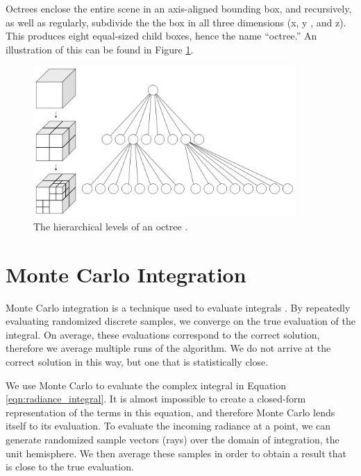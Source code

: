 Octrees enclose the entire scene in an axis-aligned bounding box, and recursively, as well as regularly, subdivide the the box in all three dimensions (x, y , and z). This produces eight equal-sized child boxes, hence the name “octree.” An illustration of this can be found in Figure \ref{fig:octree}.

\begin{figure}
   \centering
   \includegraphics[width=100mm]{../img/octree.png}
   \captionfonts
   \caption[Octree]{The hierarchical levels of an octree \cite{bib:octree}.}
   \label{fig:octree}
\end{figure}

\section{Monte Carlo Integration}
\label{sec:monte_carlo_integration}

Monte Carlo integration is a technique used to evaluate integrals \cite{bib:pbr}. By repeatedly evaluating randomized discrete samples, we converge on the true evaluation of the integral. On average, these evaluations correspond to the correct solution, therefore we average multiple runs of the algorithm. We do not arrive at the correct solution in this way, but one that is statistically close.

We use Monte Carlo to evaluate the complex integral in Equation \ref{eqn:radiance_integral}. It is almost impossible to create a closed-form representation of the terms in this equation, and therefore Monte Carlo lends itself to its evaluation. To evaluate the incoming radiance at a point, we can generate randomized sample vectors (rays) over the domain of integration, the unit hemisphere. We then average these samples in order to obtain a result that is close to the true evaluation.

